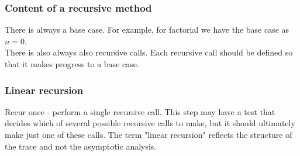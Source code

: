 \documentclass[a4paper]{article}
\theoremstyle{plain}
\theoremstyle{definition}
\theoremstyle{remark}
\begin{document}
\subsubsection{Content of a recursive method}
There is always a base case. For example, for factorial we have the base case as $n=0$. \\
There is also always also recursive calls. Each recursive call should be defined so that it makes progress to a base case.
\subsubsection{Linear recursion}
Recur once - perform a single recursive call. This step may have a test that decides which of several possible recursive calls to make, but it should ultimately make just one of these calls. The term "linear recursion" reflects the structure of the trace and not the asymptotic analysis. 
\end{document}
